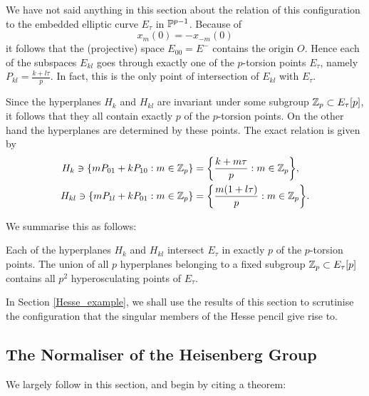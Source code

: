We have not said anything in this section about the relation of this configuration to the embedded elliptic curve $E_{\tau}$ in $\mathbb{P}^{p-1}$. Because of
\begin{equation*}
	x_{m}(0) = -x_{-m}(0)
\end{equation*}
it follows that the (projective) space $E_{00} = E^{-}$ contains the origin $O$. Hence each of the subspaces $E_{kl}$ goes through exactly one of the $p$-torsion points $E_{\tau}$, namely $P_{kl} = \tfrac{k + l \tau}{p}$. In fact, this is the only point of intersection of $E_{kl}$ with $E_{\tau}$.

Since the hyperplanes $H_{k}$ and $H_{kl}$ are invariant under some subgroup $\mathbb{Z}_{p} \subset E_{\tau}[p]$, it follows that they all contain exactly $p$ of the $p$-torsion points. On the other hand the hyperplanes are determined by these points. The exact relation is given by
\begin{equation*}
	\begin{split}
	H_{k} \ni \{ mP_{01} + kP_{10}: m \in \mathbb{Z}_{p}\} &= \bigg\{ \frac{k + m\tau}{p} : m \in \mathbb{Z}_{p} \bigg\},\\
	H_{kl} \ni \{mP_{1l} + kP_{01}: m \in \mathbb{Z}_{p} \}&= \bigg\{ \frac{m(1 + l\tau)}{p} : m \in \mathbb{Z}_{p}\bigg\}.
	\end{split}
\end{equation*}

We summarise this as follows:\\

\begin{prop}\cite{Hulek_1983}
	Each of the hyperplanes $H_{k}$ and $H_{kl}$ intersect $E_{\tau}$ in exactly $p$ of the $p$-torsion points. The union of all $p$ hyperplanes belonging to a fixed subgroup $\mathbb{Z}_{p} \subset E_{\tau}[p]$ contains all $p^{2}$ hyperosculating points of $E_{\tau}$.\\
\end{prop}

In Section \ref{Hesse_example}, we shall use the results of this section to scrutinise the configuration that the singular members of the Hesse pencil give rise to.

\subsection{The Normaliser of the Heisenberg Group}

We largely follow \cite{Nieto_1992} in this section, and begin by citing a theorem:\\

